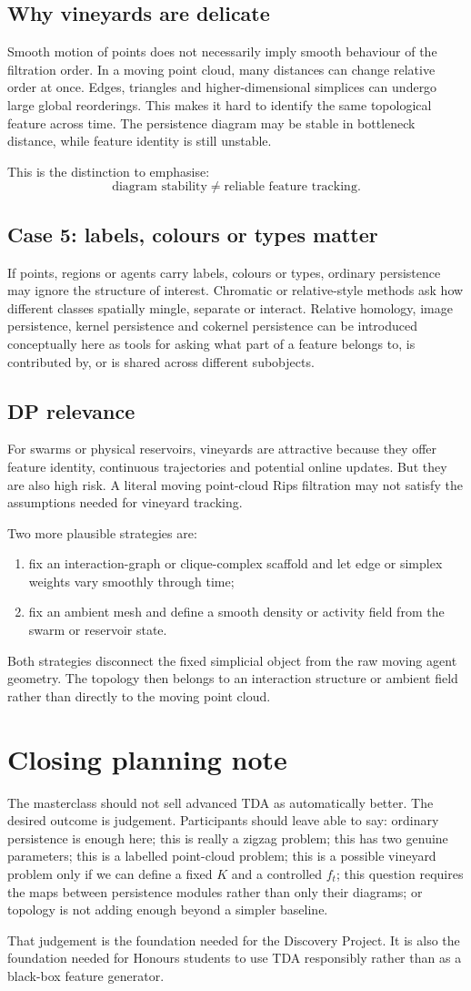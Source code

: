 \documentclass[11pt,a4paper]{article}
\newcommand{\planningbox}[2]{%
\subsection*{#1}
#2
}
\begin{document}
\planningbox{Why vineyards are delicate}{
Smooth motion of points does not necessarily imply smooth behaviour of the
filtration order. In a moving point cloud, many distances can change relative
order at once. Edges, triangles and higher-dimensional simplices can undergo
large global reorderings. This makes it hard to identify the same topological
feature across time. The persistence diagram may be stable in bottleneck
distance, while feature identity is still unstable.

This is the distinction to emphasise:
\[
\text{diagram stability} \neq \text{reliable feature tracking}.
\]
}

\planningbox{Case 5: labels, colours or types matter}{
If points, regions or agents carry labels, colours or types, ordinary
persistence may ignore the structure of interest. Chromatic or relative-style
methods ask how different classes spatially mingle, separate or interact.
Relative homology, image persistence, kernel persistence and cokernel
persistence can be introduced conceptually here as tools for asking what part
of a feature belongs to, is contributed by, or is shared across different
subobjects.
}

\planningbox{DP relevance}{
For swarms or physical reservoirs, vineyards are attractive because they offer
feature identity, continuous trajectories and potential online updates. But
they are also high risk. A literal moving point-cloud Rips filtration may not
satisfy the assumptions needed for vineyard tracking.

Two more plausible strategies are:
\begin{enumerate}
    \item fix an interaction-graph or clique-complex scaffold and let edge or
    simplex weights vary smoothly through time;
    \item fix an ambient mesh and define a smooth density or activity field
    from the swarm or reservoir state.
\end{enumerate}
Both strategies disconnect the fixed simplicial object from the raw moving
agent geometry. The topology then belongs to an interaction structure or
ambient field rather than directly to the moving point cloud.
}

\section*{Closing planning note}

The masterclass should not sell advanced TDA as automatically better. The
desired outcome is judgement. Participants should leave able to say:
ordinary persistence is enough here; this is really a zigzag problem; this has
two genuine parameters; this is a labelled point-cloud problem; this is a
possible vineyard problem only if we can define a fixed \(K\) and a controlled
\(f_t\); this question requires the maps between persistence modules rather
than only their diagrams; or topology is not adding enough beyond a simpler
baseline.

That judgement is the foundation needed for the Discovery Project. It is also
the foundation needed for Honours students to use TDA responsibly rather than
as a black-box feature generator.
\end{document}
